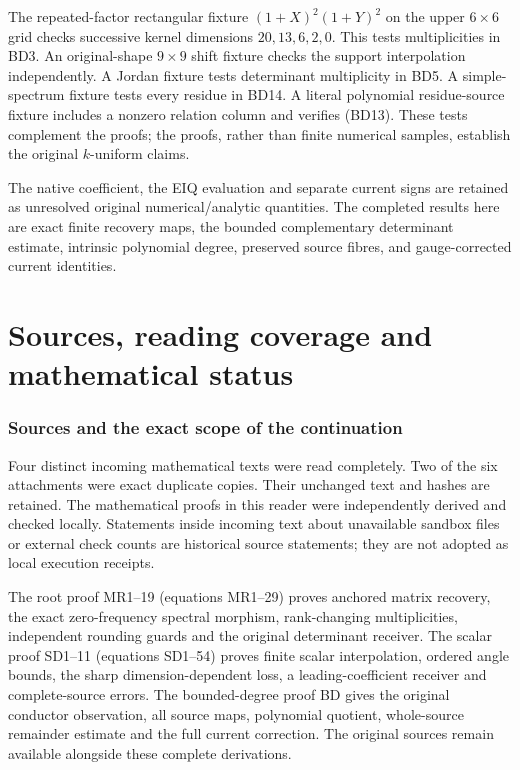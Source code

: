 \documentclass[11pt]{article}
\begin{document}
The repeated-factor rectangular fixture \((1+X)^2(1+Y)^2\) on the upper \(6\times6\) grid checks successive kernel dimensions \(20,13,6,2,0\). This tests multiplicities in BD3. An original-shape \(9\times9\) shift fixture checks the support interpolation independently. A Jordan fixture tests determinant multiplicity in BD5. A simple-spectrum fixture tests every residue in BD14. A literal polynomial residue-source fixture includes a nonzero relation column and verifies (BD13). These tests complement the proofs; the proofs, rather than finite numerical samples, establish the original \(k\)-uniform claims.

The native coefficient, the EIQ evaluation and separate current signs are retained as unresolved original numerical/analytic quantities. The completed results here are exact finite recovery maps, the bounded complementary determinant estimate, intrinsic polynomial degree, preserved source fibres, and gauge-corrected current identities.

\clearpage\part{Sources, reading coverage and mathematical status}
\section{Sources and the exact scope of the continuation}\label{sources-and-the-exact-scope-of-the-continuation}

Four distinct incoming mathematical texts were read completely. Two of the six attachments were exact duplicate copies. Their unchanged text and hashes are retained. The mathematical proofs in this reader were independently derived and checked locally. Statements inside incoming text about unavailable sandbox files or external check counts are historical source statements; they are not adopted as local execution receipts.

The root proof MR1--19 (equations MR1--29) proves anchored matrix recovery, the exact zero-frequency spectral morphism, rank-changing multiplicities, independent rounding guards and the original determinant receiver. The scalar proof SD1--11 (equations SD1--54) proves finite scalar interpolation, ordered angle bounds, the sharp dimension-dependent loss, a leading-coefficient receiver and complete-source errors. The bounded-degree proof BD gives the original conductor observation, all source maps, polynomial quotient, whole-source remainder estimate and the full current correction. The original sources remain available alongside these complete derivations.
\end{document}
